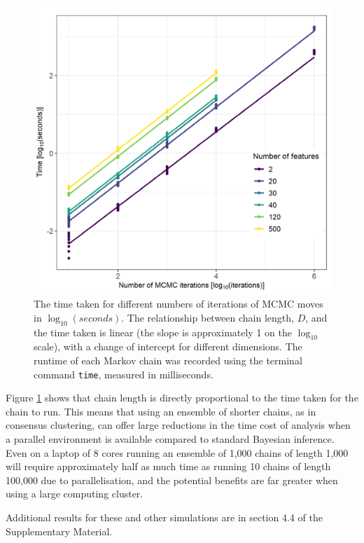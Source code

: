 \documentclass{bmcart}
\begin{document}
	\begin{figure} %
		\centering
		\includegraphics[scale=0.7]{./Images/Simulations/TimeComparison.png}	
		\caption{The time taken for different numbers of iterations of MCMC moves in $\log_{10}(seconds)$. The relationship between chain length, $D$, and the time taken is linear (the slope is approximately 1 on the $\log_{10}$ scale), with a change of intercept for different dimensions. The runtime of each Markov chain was recorded using the terminal command \texttt{time}, measured in milliseconds.}
		\label{fig:timeMCMC}
	\end{figure}
	
	Figure \ref{fig:timeMCMC} shows that chain length is directly proportional to the time taken for the chain to run. This means that using an ensemble of shorter chains, as in consensus clustering, can offer large reductions in the time cost of analysis when a parallel environment is available compared to standard Bayesian inference. Even on a laptop of 8 cores running an ensemble of 1,000 chains of length 1,000 will require approximately half as much time as running 10 chains of length 100,000 due to parallelisation, and the potential benefits are far greater when using a large computing cluster.
	
	Additional results for these and other simulations are in section 4.4 of the Supplementary Material. 
	
\end{document}
